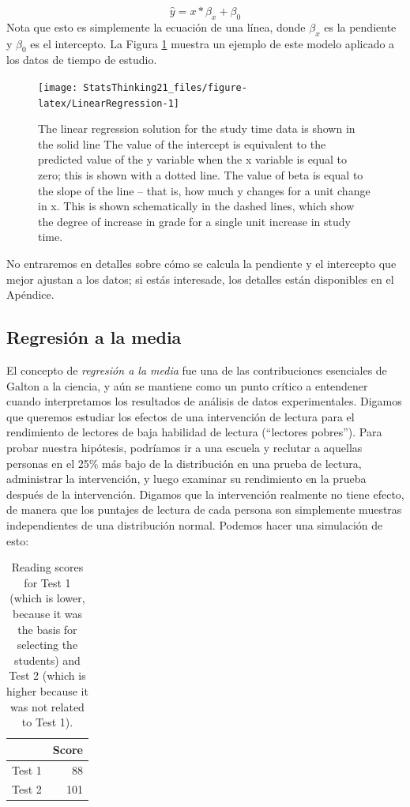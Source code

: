 \documentclass[
  12pt,
]{book}
\theoremstyle{definition}
\theoremstyle{definition}
\theoremstyle{definition}
\theoremstyle{remark}
\begin{document}
\[
\hat{y} = x * \beta_x + \beta_0 
\]
Nota que esto es simplemente la ecuación de una línea, donde \(\beta_x\) es la pendiente y \(\beta_0\) es el intercepto. La Figura \ref{fig:LinearRegression} muestra un ejemplo de este modelo aplicado a los datos de tiempo de estudio.

\begin{figure}
\texttt{[image: StatsThinking21\_files/figure-latex/LinearRegression-1]} \caption{The linear regression solution for the study time data is shown in the solid line The value of the intercept is equivalent to the predicted value of the y variable when the x variable is equal to zero; this is shown with a dotted line.  The value of beta is equal to the slope of the line -- that is, how much y changes for a unit change in x.  This is shown schematically in the dashed lines, which show the degree of increase in grade for a single unit increase in study time.}\label{fig:LinearRegression}
\end{figure}

No entraremos en detalles sobre cómo se calcula la pendiente y el intercepto que mejor ajustan a los datos; si estás interesade, los detalles están disponibles en el Apéndice.

\hypertarget{regression-to-the-mean}{%
\subsection{Regresión a la media}\label{regression-to-the-mean}}

El concepto de \emph{regresión a la media} fue una de las contribuciones esenciales de Galton a la ciencia, y aún se mantiene como un punto crítico a entendener cuando interpretamos los resultados de análisis de datos experimentales. Digamos que queremos estudiar los efectos de una intervención de lectura para el rendimiento de lectores de baja habilidad de lectura (``lectores pobres''). Para probar nuestra hipótesis, podríamos ir a una escuela y reclutar a aquellas personas en el 25\% más bajo de la distribución en una prueba de lectura, administrar la intervención, y luego examinar su rendimiento en la prueba después de la intervención. Digamos que la intervención realmente no tiene efecto, de manera que los puntajes de lectura de cada persona son simplemente muestras independientes de una distribución normal. Podemos hacer una simulación de esto:

\begin{table}

\caption{\label{tab:unnamed-chunk-98}Reading scores for Test 1 (which is lower, because it was the basis for selecting the students) and Test 2 (which is higher because it was not related to Test 1).}
\centering
\begin{tabular}[t]{l|r}
\hline
  & Score\\
\hline
Test 1 & 88\\
\hline
Test 2 & 101\\
\hline
\end{tabular}
\end{table}
\end{document}

